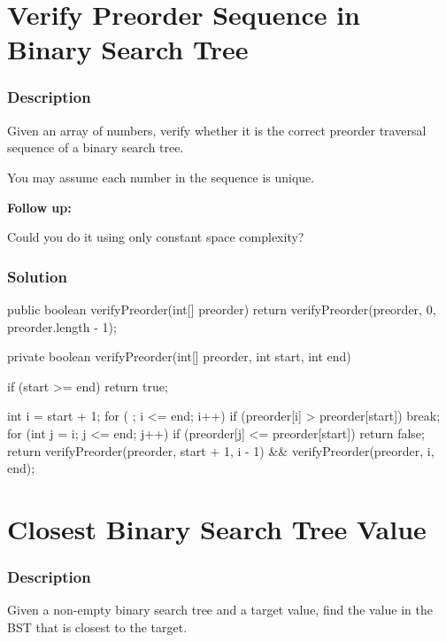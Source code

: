 \newpage

\section{Verify Preorder Sequence in Binary Search Tree} %

\subsubsection{Description}
Given an array of numbers, verify whether it is the correct preorder traversal sequence of a binary search tree.

You may assume each number in the sequence is unique.

\textbf{Follow up:}

Could you do it using only constant space complexity?

\subsubsection{Solution}

\begin{Code}
public boolean verifyPreorder(int[] preorder) {
    return verifyPreorder(preorder, 0, preorder.length - 1);
}

private boolean verifyPreorder(int[] preorder, int start, int end) {
    if (start >= end) {
        return true;
    }

    int i = start + 1;
    for ( ; i <= end; i++) {
        if (preorder[i] > preorder[start]) {
            break;
        }
    }
    for (int j = i; j <= end; j++) {
        if (preorder[j] <= preorder[start]) {
            return false;
        }
    }
    return verifyPreorder(preorder, start + 1, i - 1) && verifyPreorder(preorder, i, end);
}
\end{Code}

\newpage

\section{Closest Binary Search Tree Value} %

\subsubsection{Description}
Given a non-empty binary search tree and a target value, find the value in the BST that is closest to the target.


